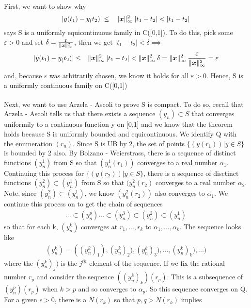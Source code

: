\documentclass[11pt]{SelfArxOneColBMN}
\begin{document}
\begin{solution}
  First, we want to show why
  \begin{eqnarray*}
    |y(t_1)-y_(t_2)| &\leq&   \|\boldsymbol{x}\|^2_\infty \: |t_1 - t_2| < |t_1 - t_2|
  \end{eqnarray*}
  says S is a uniformly equicontinuous family in C([0,1]). To do this, pick some $\varepsilon > 0$ and set $\delta = \frac{\varepsilon}{\|\boldsymbol{x}\|^2_\infty }$, then we get $|t_1-t_2| < \delta \implies$
  \begin{eqnarray*}
    |y(t_1)-y_(t_2)| &\leq&   \|\boldsymbol{x}\|^2_\infty \: |t_1 - t_2| < \|\boldsymbol{x}\|^2_\infty \: \delta = \|\boldsymbol{x}\|^2_\infty \: \frac{\varepsilon}{\|\boldsymbol{x}\|^2_\infty } = \varepsilon
  \end{eqnarray*}
  and, because $\varepsilon$ was arbitrarily chosen, we know it holds for all $\varepsilon > 0$. Hence, S is a uniformly continuous family on C([0,1])\\
  \\
  Next, we want to use Arzela - Ascoli to prove S is compact. To do so, recall that Arzela - Ascoli tells us that there exists a sequence $(y_n) \subset S$ that converges uniformily to a continuous function y on [0,1] and we know that the theorem holds because S is uniformly bounded and equicontinuous. We identify Q with the enumeration $(r_n)$. Since S is UB by 2, the set of points $\{(y(r_1))|y \in S\}$ is bounded by 2 also. By Bolzano - Weierstrass, there is a sequence of distinct functions $(y_n^1)$ from S so that $(y_n^1(r_1))$ converges to a real number $\alpha_1$. Continuing this process for $\{(y(r_2))|y \in S\}$, there is a sequence of disctinct functions $(y_n^2) \subset (y_n^1)$ from S so that $(y_n^2(r_2)$ converges to a real number $\alpha_2$. Note, since $(y_n^2) \subset (y_n^1)$, we know $(y_n^2(r_2))$ also converges to $\alpha_1$. We continue this process on to get the chain of sequences
  \begin{eqnarray*}
    ... \subset (y_n^p) ... \subset (y_n^3) \subset (y_n^2) \subset (y_n^1)
  \end{eqnarray*}
  so that for each k, $(y_n^k)$ converges at $r_1,...,r_k$ to $\alpha_1,...,\alpha_k$. The sequence looks like
  \begin{eqnarray*}
    (y_n^k) = ((y_n^k)_1),(y_n^k)_2),(y_n^k)_3),...,(y_n^k)_k),...)
  \end{eqnarray*}
  where the $(y_n^k)_j)$ is the $j^{th}$ element of the sequence. If we fix the rational number $r_p$ and consider the sequence $((y_n^k)_k)(r_p)$. This is a subsequence of $(y_n^p)(r_p)$ when $k > p$ and so converges to $\alpha_p$. So this sequence converges on Q. For a given $\epsilon > 0$, there is a $N(r_k)$ so that $p,q > N(r_k)$ implies

\end{solution}
\end{document}
